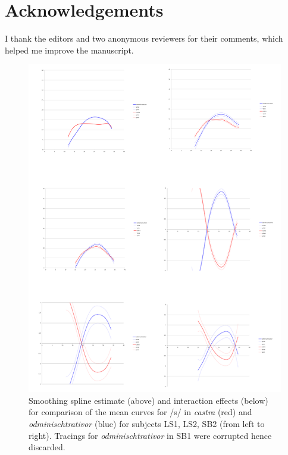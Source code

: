 \documentclass[output=paper]{LSP/langsci}
\begin{document}
\section*{Acknowledgements} 
I thank the editors and two anonymous reviewers for their comments, which helped me improve the manuscript.
\begin{figure}[b!]
\includegraphics[width=.85\textwidth,trim=0 20 0 0, clip]{illustrations/sprea_fig5_collage}
\caption{Smoothing spline estimate (above) and interaction effects (below) for comparison of the mean curves for /s/ in \textit{castra} (red) and \textit{odminischtrativor} (blue) for subjects LS1, LS2, SB2 (from left to right). Tracings for \textit{odminischtrativor} in SB1 were corrupted hence discarded.}
\label{fig:5}  
\end{figure}
\clearpage

\printbibliography[heading=subbibliography,notkeyword=this]
\end{document}
